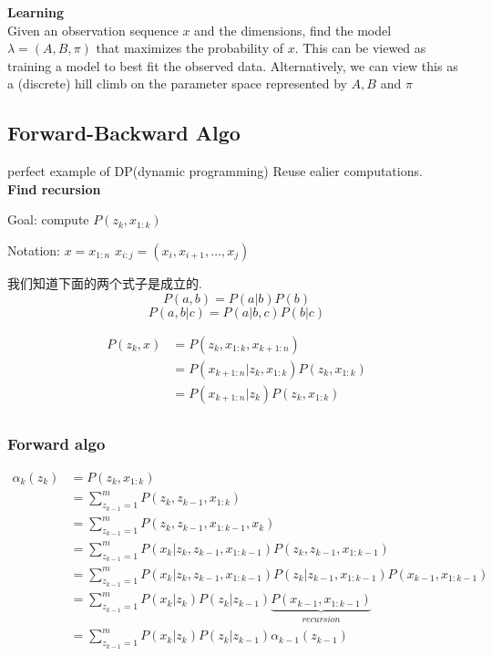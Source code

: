\documentclass{article}
\begin{document}
\begin{problem}
\textbf{Learning}\\
Given an observation sequence $x$ and the dimensions, find the model $\lambda = (A,B,\pi)$ that maximizes the probability of $x$.  
This can be viewed as training a model to best fit the observed data. Alternatively, we can view this as a (discrete) hill climb on the parameter
space represented by $A,B$ and $\pi$
\end{problem}

\subsection{Forward-Backward Algo}
perfect example of DP(dynamic programming) Reuse ealier computations.\\
\textbf{Find recursion}

Goal: compute $P(z_k, x_{1:k})$

Notation: 
$x = x_{1:n}$
$x_{i:j} = (x_i, x_{i+1}, \ldots, x_j)$

我们知道下面的两个式子是成立的.
$$P(a,b) = P(a|b)P(b)$$
$$P(a,b|c) = P(a|b,c)P(b|c)$$

$$
\begin{aligned}
P(z_k,x)
& = P(z_k, x_{1:k}, x_{k+1:n}) \\ 
& = P(x_{k+1:n}|z_k, x_{1:k} ) P(z_k, x_{1:k} ) \\ 
& = P(x_{k+1:n}|z_k) P(z_k, x_{1:k} ) \\ 
\end{aligned}
$$

\subsubsection{Forward algo}
$$
\begin{aligned}
\alpha_k(z_k)
& = P(z_k, x_{1:k}) \\ 
& = \sum_{z_{k-1} = 1}^m P(z_k, z_{k-1}, x_{1:k}) \\ 
& = \sum_{z_{k-1} = 1}^m P(z_k, z_{k-1}, x_{1:k-1}, x_k) \\ 
& = \sum_{z_{k-1} = 1}^m P(x_k|z_k, z_{k-1}, x_{1:k-1}) P(z_k, z_{k-1}, x_{1:k-1}) \\ 
& = \sum_{z_{k-1} = 1}^m P(x_k|z_k, z_{k-1}, x_{1:k-1}) P(z_k| z_{k-1}, x_{1:k-1}) P(x_{k-1}, x_{1:k-1}) \\ 
& = \sum_{z_{k-1} = 1}^m P(x_k|z_k) P(z_k| z_{k-1}) \underbrace{P(x_{k-1}, x_{1:k-1})}_{recursion} \\ 
& = \sum_{z_{k-1} = 1}^m P(x_k|z_k) P(z_k| z_{k-1}) \alpha_{k-1}(z_{k-1}) \\ 
\end{aligned}
$$
\end{document}
